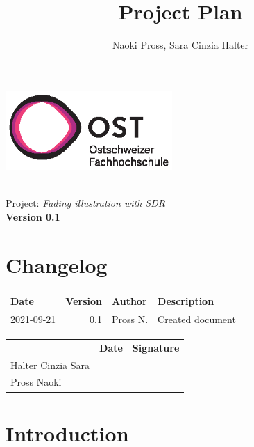 \documentclass[a4paper, twosided, 11pt]{scrartcl}
\title{Project Plan}
\author{Naoki Pross, Sara Cinzia Halter}
\begin{document}
\begin{titlepage}
	\includegraphics[height=3cm]{fig/ost-logo}
	\begin{flushright}
		\vspace{5cm}
		{\Huge \bfseries \thetitle} \\
		\vspace{5mm}
		{\LARGE Project: \textit{Fading illustration with SDR}} \\
		\vspace{5mm}
		{\LARGE \bfseries Version 0.1}
	\end{flushright}
\end{titlepage}

\section*{Changelog}
\begin{tabularx}{\textwidth}{lrlX}
	\toprule
	\bfseries Date & \bfseries Version & \bfseries Author & \bfseries Description \\
	\midrule
	2021-09-21 & 0.1 & Pross N.  & Created document \\
	\bottomrule
\end{tabularx}

\vfill
{
	\renewcommand{\arraystretch}{2}
	\begin{tabularx}{\textwidth}{lp{}X}
		                   & \bfseries Date & \bfseries Signature\\
		Halter Cinzia Sara & \hrulefill & \hrulefill \\
		Pross Naoki        & \hrulefill & \hrulefill \\
	\end{tabularx}
}

\clearpage
\tableofcontents
\listoffigures
\listoftables
\clearpage

\section{Introduction}

\clearpage
\end{document}
